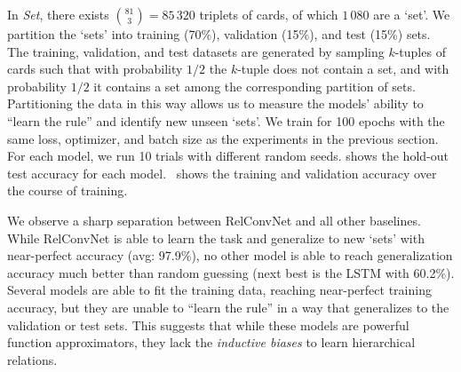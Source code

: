 
In \textit{Set}, there exists $\binom{81}{3} = 85\,320$ triplets of cards, of which $1\,080$ are a `set'. We partition the `sets' into training (70\%), validation (15\%), and test (15\%) sets. The training, validation, and test datasets are generated by sampling $k$-tuples of cards such that with probability $1/2$ the $k$-tuple does not contain a set, and with probability $1/2$ it contains a set among the corresponding partition of sets. Partitioning the data in this way allows us to measure the models' ability to ``learn the rule'' and identify new unseen `sets'.
We train for 100 epochs with the same loss, optimizer, and batch size as the experiments in the previous section. For each model, we run 10 trials with different random seeds.
 shows the hold-out test accuracy for each model.~ shows the training and validation accuracy over the course of training.

We observe a sharp separation between RelConvNet and all other baselines. While RelConvNet is able to learn the task and generalize to new `sets' with near-perfect accuracy (avg: 97.9\%), no other model is able to reach generalization accuracy much better than random guessing (next best is the LSTM with 60.2\%). Several models are able to fit the training data, reaching near-perfect training accuracy, but they are unable to ``learn the rule'' in a way that generalizes to the validation or test sets. This suggests that while these models are powerful function approximators, they lack the \textit{inductive biases} to learn hierarchical relations.

